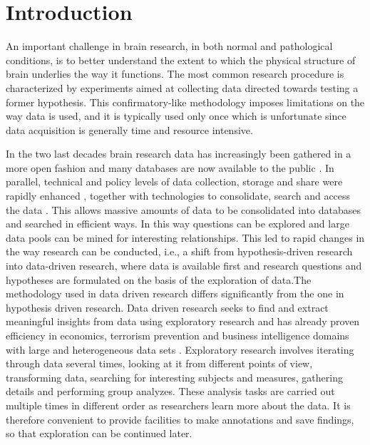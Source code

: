\documentclass[utf8,paper]{frontiersSCNS} %
\begin{document}




\section{Introduction}


An important challenge in brain research, in both normal and pathological conditions, is to better understand the extent to which the physical structure of brain underlies the way it functions. The most common research procedure is characterized by experiments aimed at collecting data directed towards testing a former hypothesis. This confirmatory-like methodology imposes limitations on the way data is used, and it is typically used only once which is unfortunate since data acquisition is generally time and resource intensive.

In the two last decades brain research data has increasingly been gathered in a more open fashion and many databases are now available to the public \citep{milham_open_2012}. In parallel, technical and policy levels of data collection, storage and share were rapidly enhanced \citep{eckersley_neuroscience_2003}, together with technologies to consolidate, search and access the data \citep{van_horn_is_2009, wood_harnessing_2014}. 
This allows massive amounts of data to be consolidated into databases and searched in efficient ways.  In this way questions can be explored and large data pools can be mined for interesting relationships. This led to rapid changes in the way research can be conducted, i.e., a shift from hypothesis-driven research into data-driven research, where data is available first and research questions and hypotheses are formulated on the basis of the exploration of data.The methodology used in data driven research differs significantly from the one in hypothesis driven research. Data driven research seeks to find and extract meaningful insights from data using exploratory research \citep{tukey_we_1980} and has already proven efficiency in economics, terrorism prevention and business intelligence domains with large and heterogeneous data sets \cite{cook_illuminating_2005}. Exploratory research involves iterating through data several times, looking at it from different points of view, transforming data, searching for interesting subjects and measures, gathering details and performing group analyzes. These analysis tasks are carried out multiple times in different order as researchers learn more about the data. It is therefore convenient to provide facilities to make annotations and save findings, so that exploration can be continued later.
\end{document}
